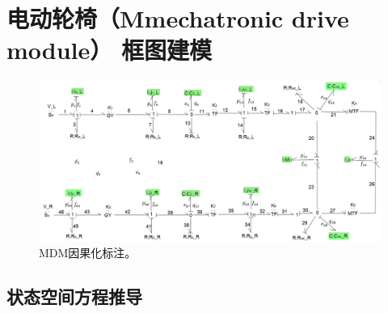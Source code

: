 \clearpage
\section{电动轮椅（Mmechatronic drive module） 框图建模}

\begin{figure}[h]
	\centering
	\includegraphics[width=\textwidth]{fig/MDM.png}
	\caption{MDM因果化标注。}\label{fig:mdm}
\end{figure}
\subsection{状态空间方程推导}

